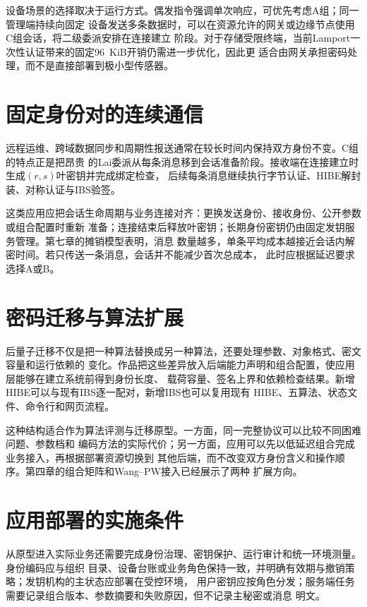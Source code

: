 设备场景的选择取决于运行方式。偶发指令强调单次响应，可优先考虑A组；同一管理端持续向固定
设备发送多条数据时，可以在资源允许的网关或边缘节点使用C组会话，将二级委派安排在连接建立
阶段。对于存储受限终端，当前Lamport一次性认证带来的固定96~KiB开销仍需进一步优化，因此更
适合由网关承担密码处理，而不是直接部署到极小型传感器。

\section{固定身份对的连续通信}

远程运维、跨域数据同步和周期性报送通常在较长时间内保持双方身份不变。C组的特点正是把昂贵
的Lai委派从每条消息移到会话准备阶段。接收端在连接建立时生成$(r,s)$叶密钥并完成绑定检查，
后续每条消息继续执行字节认证、HIBE解封装、对称认证与IBS验签。

这类应用应把会话生命周期与业务连接对齐：更换发送身份、接收身份、公开参数或组合配置时重新
准备；连接结束后释放叶密钥；长期身份密钥仍由固定发钥服务管理。第七章的摊销模型表明，消息
数量越多，单条平均成本越接近会话内解密时间。若只传送一条消息，会话并不能减少首次总成本，
此时应根据延迟要求选择A或B。

\section{密码迁移与算法扩展}

后量子迁移不仅是把一种算法替换成另一种算法，还要处理参数、对象格式、密文容量和运行依赖的
变化。作品把这些差异放入后端能力声明和组合配置，使应用层能够在建立系统前得到身份长度、
载荷容量、签名上界和依赖检查结果。新增HIBE可以与现有IBS逐一配对，新增IBS也可以复用现有
HIBE、五算法、状态文件、命令行和网页流程。

这种结构适合作为算法评测与迁移原型。一方面，同一完整协议可以比较不同困难问题、参数档和
编码方法的实际代价；另一方面，应用可以先以低延迟组合完成业务接入，再根据部署资源切换到
其他后端，而不改变双方身份含义和操作顺序。第四章的组合矩阵和Wang--PW接入已经展示了两种
扩展方向。

\section{应用部署的实施条件}

从原型进入实际业务还需要完成身份治理、密钥保护、运行审计和统一环境测量。身份编码应与组织
目录、设备台账或业务角色保持一致，并明确有效期与撤销策略；发钥机构的主状态应部署在受控环境，
用户密钥应按角色分发；服务端任务需要记录组合版本、参数摘要和失败原因，但不记录主秘密或消息
明文。

